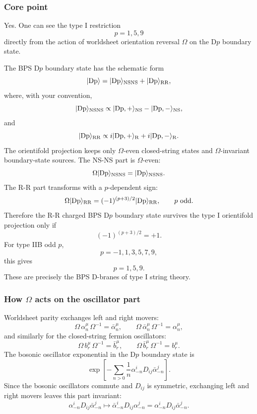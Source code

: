 \documentclass[
  10pt,
  a4paper,
  openany]{book}
\begin{document}
\subsubsection{Core point}\label{core-point-11}

Yes. One can see the type I restriction \[
p=1,5,9
\] directly from the action of worldsheet orientation reversal
\(\Omega\) on the D\(p\) boundary state.

The BPS D\(p\) boundary state has the schematic form \[
|{\rm Dp}\rangle
=
|{\rm Dp}\rangle_{\mathrm{NSNS}}
+
|{\rm Dp}\rangle_{\mathrm{RR}},
\] where, with your convention, \[
|{\rm Dp}\rangle_{\mathrm{NSNS}}
\propto
|{\rm Dp},+\rangle_{\mathrm{NS}}
-
|{\rm Dp},-\rangle_{\mathrm{NS}},
\] and \[
|{\rm Dp}\rangle_{\mathrm{RR}}
\propto
i|{\rm Dp},+\rangle_{\mathrm{R}}
+
i|{\rm Dp},-\rangle_{\mathrm{R}}.
\] The orientifold projection keeps only \(\Omega\)-even closed-string
states and \(\Omega\)-invariant boundary-state sources. The NS-NS part
is \(\Omega\)-even: \[
\Omega |{\rm Dp}\rangle_{\mathrm{NSNS}}
=
|{\rm Dp}\rangle_{\mathrm{NSNS}}.
\] The R-R part transforms with a \(p\)-dependent sign: \[
\Omega |{\rm Dp}\rangle_{\mathrm{RR}}
=
(-1)^{(p+3)/2}
|{\rm Dp}\rangle_{\mathrm{RR}},
\qquad
p\ \text{odd}.
\] Therefore the R-R charged BPS D\(p\) boundary state survives the type
I orientifold projection only if \[
(-1)^{(p+3)/2}=+1.
\] For type IIB odd \(p\), \[
p=-1,1,3,5,7,9,
\] this gives \[
p=1,5,9.
\] These are precisely the BPS D-branes of type I string theory.

\subsubsection{\texorpdfstring{How \(\Omega\) acts on the oscillator
part}{How \textbackslash Omega acts on the oscillator part}}\label{how-omega-acts-on-the-oscillator-part}

Worldsheet parity exchanges left and right movers: \[
\Omega\,\alpha_n^\mu\,\Omega^{-1}
=
\bar\alpha_n^\mu,
\qquad
\Omega\,\bar\alpha_n^\mu\,\Omega^{-1}
=
\alpha_n^\mu,
\] and similarly for the closed-string fermion oscillators: \[
\Omega\,b_r^\mu\,\Omega^{-1}
=
\bar b_r^\mu,
\qquad
\Omega\,\bar b_r^\mu\,\Omega^{-1}
=
b_r^\mu.
\] The bosonic oscillator exponential in the D\(p\) boundary state is \[
\exp\left[
-\sum_{n>0}
\frac{1}{n}
\alpha_{-n}^iD_{ij}\bar\alpha_{-n}^j
\right].
\] Since the bosonic oscillators commute and \(D_{ij}\) is symmetric,
exchanging left and right movers leaves this part invariant: \[
\alpha_{-n}^iD_{ij}\bar\alpha_{-n}^j
\longmapsto
\bar\alpha_{-n}^iD_{ij}\alpha_{-n}^j
=
\alpha_{-n}^iD_{ij}\bar\alpha_{-n}^j.
\]
\end{document}
